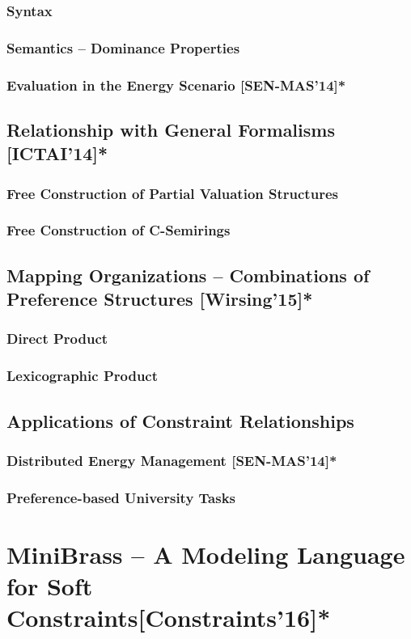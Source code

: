 \documentclass[10pt,a4paper]{book}
\begin{document}
\subsection{Syntax}
\subsection{Semantics -- Dominance Properties}
\subsection{Evaluation in the Energy Scenario [SEN-MAS'14]*}
\section{Relationship with General Formalisms [ICTAI'14]*}
\subsection{Free Construction of Partial Valuation Structures}
\subsection{Free Construction of C-Semirings}
\section{Mapping Organizations -- Combinations of Preference Structures [Wirsing'15]*}
\subsection{Direct Product}
\subsection{Lexicographic Product}
\section{Applications of Constraint Relationships}
\subsection{Distributed Energy Management [SEN-MAS'14]* }
\subsection{Preference-based University Tasks}

\chapter{MiniBrass -- A Modeling Language for Soft Constraints[Constraints'16]*}
\end{document}
